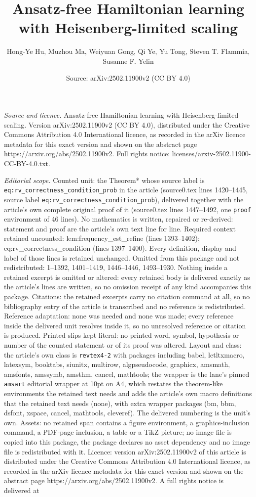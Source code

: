 \documentclass[10pt,a4paper]{amsart}
\title[Ansatz-free Hamiltonian learning with Heisenberg-limited sca]{Ansatz-free Hamiltonian learning with Heisenberg-limited scaling}
\author{Hong-Ye Hu, Muzhou Ma, Weiyuan Gong, Qi Ye, Yu Tong, Steven T. Flammia, Susanne F. Yelin}
\date{Source: arXiv:2502.11900v2 (CC BY 4.0)}
\begin{document}
\maketitle

\noindent\emph{Source and licence.} Ansatz-free Hamiltonian learning with Heisenberg-limited scaling. Version arXiv:2502.11900v2 (CC BY 4.0), distributed under the Creative Commons Attribution 4.0 International licence, as recorded in the arXiv licence metadata for this exact version and shown on the abstract page https://arxiv.org/abs/2502.11900v2. Full rights notice: licenses/arxiv-2502.11900-CC-BY-4.0.txt.\par\smallskip

\noindent\textit{Editorial scope.} Counted unit: the Theorem* whose source label is \texttt{eq:rv\_correctness\_condition\_prob} in the article (source0.tex lines 1420--1445, source label \texttt{eq:rv\_correctness\_condition\_prob}), delivered together with the article's own complete original proof of it (source0.tex lines 1447--1492, one \texttt{proof} environment of 46 lines). No mathematics is written, repaired or re-derived: statement and proof are the article's own text line for line. Required context retained uncounted: lem:frequency\_est\_refine (lines 1393--1402); eq:rv\_correctness\_condition (lines 1397--1400). Every definition, display and label of those lines is retained unchanged. Omitted from this package and not redistributed: 1--1392, 1401--1419, 1446--1446, 1493--1930. Nothing inside a retained excerpt is omitted or altered: every retained body is delivered exactly as the article's lines are written, so no omission receipt of any kind accompanies this package. Citations: the retained excerpts carry no citation command at all, so no bibliography entry of the article is transcribed and no reference is redistributed. Reference adaptation: none was needed and none was made; every reference inside the delivered unit resolves inside it, so no unresolved reference or citation is produced. Printed slips kept literal: no printed word, symbol, hypothesis or number of the counted statement or of its proof was altered. Layout and class: the article's own class is \texttt{revtex4-2} with packages including babel, letltxmacro, latexsym, booktabs, siunitx, multirow, algpseudocode, graphicx, amsmath, amsfonts, amssymb, amsthm, cancel, mathtools; the wrapper is the lane's pinned \texttt{amsart} editorial wrapper at 10pt on A4, which restates the theorem-like environments the retained text needs and adds the article's own macro definitions that the retained text needs (none), with extra wrapper packages (bm, bbm, dsfont, xspace, cancel, mathtools, cleveref). The delivered numbering is the unit's own. Assets: no retained span contains a figure environment, a graphics-inclusion command, a PDF-page inclusion, a table or a TikZ picture; no image file is copied into this package, the package declares no asset dependency and no image file is redistributed with it. Licence: version arXiv:2502.11900v2 of this article is distributed under the Creative Commons Attribution 4.0 International licence, as recorded in the arXiv licence metadata for this exact version and shown on the abstract page https://arxiv.org/abs/2502.11900v2. A full rights notice is delivered at 
\end{document}
